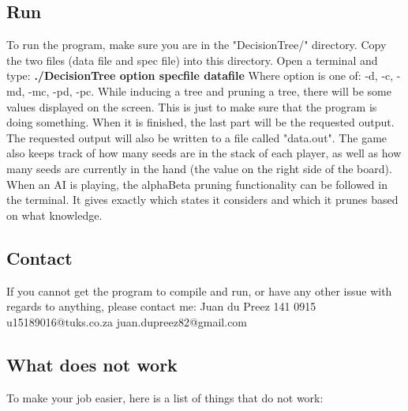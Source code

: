 \documentclass[a4paper]{article}
\begin{document}
	\subsection{Run}
	To run the program, make sure you are in the "DecisionTree/" directory. Copy the two files (data file and spec file) into 			this directory. Open a terminal and type: \newline
	\newline	
	\textbf{./DecisionTree  option specfile datafile}
	\newline	
	\newline
	Where option is one of: -d, -c, -md, -mc, -pd, -pc.
	\newline
	\newline
	While inducing a tree and pruning a tree, there will be some values displayed on the screen. This is just to make sure that 		the program is doing something. When it is finished, the last part will be the requested output. The requested output will 			also be written to a file called "data.out".
	\newline	
	\newline
	The game also keeps track of how many seeds are in the stack of each player, as well as how many seeds are currently in the 			hand (the value on the right side of the board).
	\newline	
	\newline
	When an AI is playing, the alphaBeta pruning functionality can be followed in the terminal. It gives exactly which states it 	considers and which it prunes based on what knowledge.
	
	
	\subsection{Contact}
	If you cannot get the program to compile and run, or have any other issue with regards to anything, please contact me: \newline
	Juan du Preez 141 0915\newline
	u15189016@tuks.co.za\newline
	juan.dupreez82@gmail.com
	
	\subsection{What does not work}
	To make your job easier, here is a list of things that do not work: \newline
	
	
\end{document}
